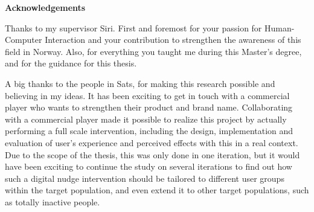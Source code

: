 \vspace*{\fill}

\vspace{1cm}
\begin{flushleft}

\large
\textbf{Acknowledgements}

Thanks to my supervisor Siri. First and foremost for your passion for Human-Computer Interaction and your contribution to strengthen the awareness of this field in Norway. Also, for everything you taught me during this Master's degree, and for the guidance for this thesis.  







A big thanks to the people in Sats, for making this research possible and believing in my ideas.  
It has been exciting to get in touch with a commercial player who wants to strengthen their product and brand name. Collaborating with a commercial player made it possible to realize this project by actually performing a full scale intervention, including the design, implementation and evaluation of user's experience and perceived effects with this in a real context. Due to the scope of the thesis, this was only done in one iteration, but it would have been exciting to continue the study on several iterations to find out how such a digital nudge intervention should be tailored to different user groups within the target population, and even extend it to other target populations, such as totally inactive people. 


\end{flushleft}
